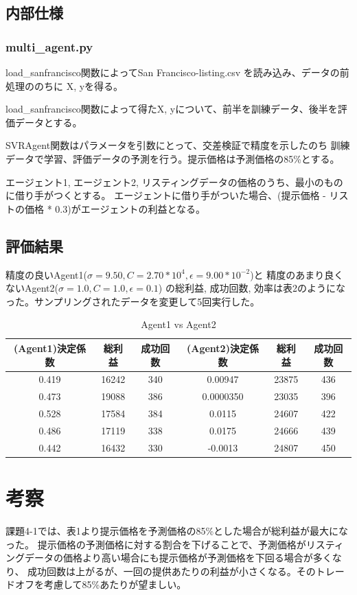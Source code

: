 \documentclass{jsarticle}
\begin{document}
\subsection{内部仕様}
\subsubsection*{multi\_agent.py}
load\_sanfrancisco関数によってSan Francisco-listing.csv を読み込み、データの前処理ののちに
X, yを得る。

load\_sanfrancisco関数によって得たX, yについて、前半を訓練データ、後半を評価データとする。

SVRAgent関数はパラメータを引数にとって、交差検証で精度を示したのち
訓練データで学習、評価データの予測を行う。提示価格は予測価格の85\%とする。

エージェント1, エージェント2, リスティングデータの価格のうち、最小のものに借り手がつくとする。
エージェントに借り手がついた場合、(提示価格 - リストの価格 * 0.3)がエージェントの利益となる。
\subsection{評価結果}
精度の良いAgent1($\sigma = 9.50, C = 2.70 * 10^4, \epsilon = 9.00 * 10^{-2}$)と
精度のあまり良くないAgent2($\sigma = 1.0, C = 1.0, \epsilon = 0.1$)
の総利益, 成功回数, 効率は表2のようになった。サンプリングされたデータを変更して5回実行した。
\begin{table}[H]
    \centering
    \begin{tabular}{|c||c|c||c||c|c|} \hline
      (Agent1)決定係数 & 総利益 & 成功回数 & (Agent2)決定係数 & 総利益 & 成功回数 \\ \hline
      0.419 & 16242 & 340 & 0.00947 & 23875 & 436 \\
      0.473 & 19088 & 386 & 0.0000350 & 23035 & 396 \\
      0.528 & 17584 & 384 & 0.0115 & 24607 & 422 \\
      0.486 & 17119 & 338 & 0.0175 & 24666 & 439 \\
      0.442 & 16432 & 330 & -0.0013 & 24807 & 450 \\ \hline
    \end{tabular}
    \caption{Agent1 vs Agent2}
\end{table}

\section{考察}
課題4-1では、表1より提示価格を予測価格の85\%とした場合が総利益が最大になった。
提示価格の予測価格に対する割合を下げることで、予測価格がリスティングデータの価格より高い場合にも提示価格が予測価格を下回る場合が多くなり、
成功回数は上がるが、一回の提供あたりの利益が小さくなる。そのトレードオフを考慮して85\%あたりが望ましい。
\end{document}
